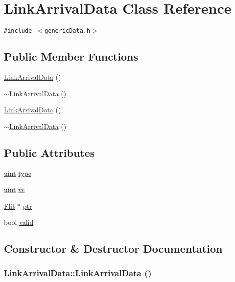 \hypertarget{classLinkArrivalData}{
\section{LinkArrivalData Class Reference}
\label{classLinkArrivalData}
}
{\tt \#include $<$genericData.h$>$}

\subsection*{Public Member Functions}
\begin{CompactItemize}
\item 
\hyperlink{classLinkArrivalData_68c73d0d5ad8327bd3d58c82fa5fcef6}{LinkArrivalData} ()
\item 
\hyperlink{classLinkArrivalData_925ca0d6244e409041fd3133efe18ed4}{$\sim$LinkArrivalData} ()
\item 
\hyperlink{classLinkArrivalData_68c73d0d5ad8327bd3d58c82fa5fcef6}{LinkArrivalData} ()
\item 
\hyperlink{classLinkArrivalData_925ca0d6244e409041fd3133efe18ed4}{$\sim$LinkArrivalData} ()
\end{CompactItemize}
\subsection*{Public Attributes}
\begin{CompactItemize}
\item 
\hyperlink{outputBuffer_8h_91ad9478d81a7aaf2593e8d9c3d06a14}{uint} \hyperlink{classLinkArrivalData_67623829975f533c48e4b6552eed2780}{type}
\item 
\hyperlink{outputBuffer_8h_91ad9478d81a7aaf2593e8d9c3d06a14}{uint} \hyperlink{classLinkArrivalData_0015d63ec0989b053ebd3236688d9e9a}{vc}
\item 
\hyperlink{classFlit}{Flit} $\ast$ \hyperlink{classLinkArrivalData_b4f6239cc040642e4020e03bff8a11a2}{ptr}
\item 
bool \hyperlink{classLinkArrivalData_2f9a1f28c8833db08318a1e2b018c9f8}{valid}
\end{CompactItemize}


\subsection{Constructor \& Destructor Documentation}
\hypertarget{classLinkArrivalData_68c73d0d5ad8327bd3d58c82fa5fcef6}{
\subsubsection[{LinkArrivalData}]{\setlength{\rightskip}{0pt plus 5cm}LinkArrivalData::LinkArrivalData ()}}
\label{classLinkArrivalData_68c73d0d5ad8327bd3d58c82fa5fcef6}


